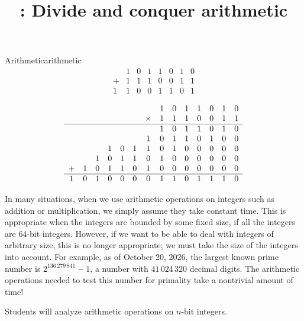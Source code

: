 \documentclass{tufte-handout}
\title{\thecourse: Divide and conquer arithmetic}
\date{}
\begin{document}
\maketitle


\begin{model*}{Arithmetic}{arithmetic}
  \[
    \begin{array}{cccccccc}
         & 1 & 0 & 1 & 1 & 0 & 1 & 0 \\
       + & 1 & 1 & 1 & 0 & 0 & 1 & 1 \\
      \hline
       1 & 1 & 0 & 0 & 1 & 1 & 0 & 1
    \end{array}
  \] \vspace{0.3in}

  \[
    \begin{array}{cccccccccccccc}
  & & & & & & &1&0&1&1&0&1&0 \\
  & & & & & &\times&1&1&1&0&0&1&1 \\
  \hline
  & & & & & & &1&0&1&1&0&1&0 \\
  & & & & & &1&0&1&1&0&1&0&0 \\
  & & &1&0&1&1&0&1&0&0&0&0&0 \\
  & &1&0&1&1&0&1&0&0&0&0&0&0 \\
 +&1&0&1&1&0&1&0&0&0&0&0&0&0 \\
 \hline
 1&0&1&0&0&0&0&1&1&0&1&1&1&0
    \end{array}
  \] \vspace{0.3in}
\end{model*}

In many situations, when we use arithmetic operations on integers such
as addition or multiplication, we simply assume they take constant
time.  This is appropriate when the integers are bounded by some fixed
size, \eg if all the integers are $64$-bit integers.  However, if we
want to be able to deal with integers of arbitrary size, this is no
longer appropriate; we must take the size of the integers into
account.  For example, as of October 20, 2026, the largest
known prime number is $2^{136\,279\,841} - 1$, a number with
$41\,024\,320$ decimal digits.  The arithmetic operations needed to
test this number for primality take a nontrivial amount of time!

\begin{objective}
  Students will analyze arithmetic operations on $n$-bit integers.
\end{objective}
\end{document}
